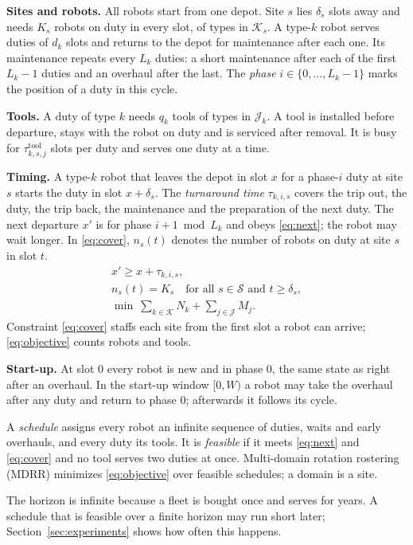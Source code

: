 \textbf{Sites and robots.}
All robots start from one depot.
Site $s$ lies $\delta_s$ slots away and needs $K_s$ robots on duty in every slot, of types in $\mathcal{K}_s$.
A type-$k$ robot serves duties of $d_k$ slots and returns to the depot for maintenance after each one.
Its maintenance repeats every $L_k$ duties: a short maintenance after each of the first $L_k - 1$ duties and an overhaul after the last.
The \emph{phase} $i \in \{0, \dots, L_k - 1\}$ marks the position of a duty in this cycle.

\textbf{Tools.}
A duty of type $k$ needs $q_k$ tools of types in $\mathcal{J}_k$.
A tool is installed before departure, stays with the robot on duty and is serviced after removal.
It is busy for $\tau^{\mathrm{tool}}_{k,s,j}$ slots per duty and serves one duty at a time.

\textbf{Timing.}
A type-$k$ robot that leaves the depot in slot $x$ for a phase-$i$ duty at site $s$ starts the duty in slot $x + \delta_s$.
The \emph{turnaround time} $\tau_{k,i,s}$ covers the trip out, the duty, the trip back, the maintenance and the preparation of the next duty.
The next departure $x'$ is for phase $i+1 \bmod L_k$ and obeys \eqref{eq:next}; the robot may wait longer.
In \eqref{eq:cover}, $n_s(t)$ denotes the number of robots on duty at site $s$ in slot $t$.
\begin{gather}
  x' \ge x + \tau_{k,i,s}, \label{eq:next}\\
  n_s(t) = K_s \quad \text{for all } s \in \mathcal{S} \text{ and } t \ge \delta_s, \label{eq:cover}\\
  \min \ \textstyle\sum_{k \in \mathcal{K}} N_k + \sum_{j \in \mathcal{J}} M_j . \label{eq:objective}
\end{gather}
Constraint \eqref{eq:cover} staffs each site from the first slot a robot can arrive; \eqref{eq:objective} counts robots and tools.

\textbf{Start-up.}
At slot $0$ every robot is new and in phase $0$, the same state as right after an overhaul.
In the start-up window $[0, W)$ a robot may take the overhaul after any duty and return to phase $0$; afterwards it follows its cycle.

A \emph{schedule} assigns every robot an infinite sequence of duties, waits and early overhauls, and every duty its tools.
It is \emph{feasible} if it meets \eqref{eq:next} and \eqref{eq:cover} and no tool serves two duties at once.
Multi-domain rotation rostering (MDRR) minimizes \eqref{eq:objective} over feasible schedules; a domain is a site.

The horizon is infinite because a fleet is bought once and serves for years.
A schedule that is feasible over a finite horizon may run short later; Section~\ref{sec:experiments} shows how often this happens.
